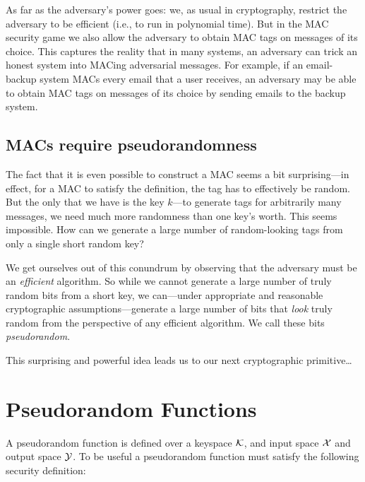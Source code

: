 As far as the adversary's power goes: we, as usual in cryptography,
restrict the adversary to be efficient (i.e., to run in polynomial time).
But in the MAC security game we also allow the adversary to obtain
MAC tags on messages of its choice.
This captures the reality that in many systems, an adversary can trick
an honest system into MACing adversarial messages.
For example, if an email-backup system MACs every email that a
user receives, an adversary may be able to obtain MAC tags on messages
of its choice by sending emails to the backup system.


\subsection{MACs require pseudorandomness}
The fact that it is even possible to construct a MAC seems a bit surprising---in effect, for a MAC to satisfy the definition, the tag has to effectively be random. But the only  that we have is the key $k$---to generate tags for arbitrarily many messages, we need much more randomness than one key's worth. This seems impossible.
How can we generate a large number of random-looking tags from only a single
short random key?

We get ourselves out of this conundrum by observing that the adversary
must be an \emph{efficient} algorithm.
So while we cannot generate a large number of truly random bits from a
short key, we can---under appropriate and reasonable
cryptographic assumptions---generate a large number of bits that \emph{look}
truly random from the perspective of any efficient algorithm.
We call these bits \emph{pseudorandom}.

This surprising and powerful idea leads us to our next cryptographic primitive\ldots

\section{Pseudorandom Functions}

A pseudorandom function is defined over a keyspace $\mathcal{K}$,
and input space $\mathcal{X}$ and output space $\mathcal{Y}$.
To be useful a pseudorandom function must satisfy the following
security definition:

